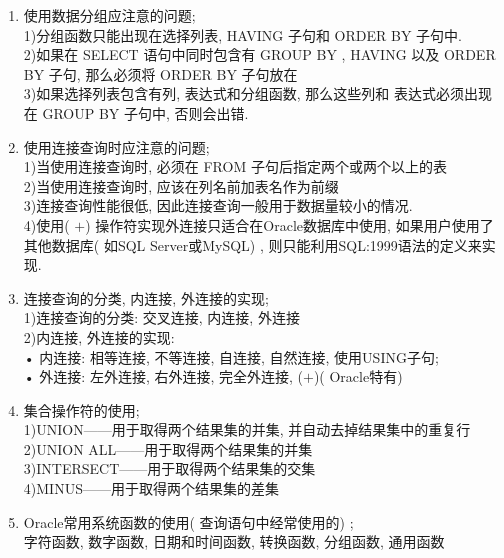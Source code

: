 \documentclass{article}                     %
\numberwithin{equation}{section}            %
\numberwithin{figure}{section}              %
\numberwithin{table}{section}               %
\begin{document}
\begin{enumerate}
\item 使用数据分组应注意的问题; \\
1)分组函数只能出现在选择列表, HAVING 子句和 ORDER BY 子句中. \\
2)如果在 SELECT 语句中同时包含有 GROUP BY , HAVING 以及 ORDER BY 子句, 那么必须将 ORDER BY 子句放在\\
3)如果选择列表包含有列, 表达式和分组函数, 那么这些列和 表达式必须出现在 GROUP BY 子句中, 否则会出错. \\



\item 使用连接查询时应注意的问题; \\
1)当使用连接查询时, 必须在 FROM 子句后指定两个或两个以上的表\\
2)当使用连接查询时, 应该在列名前加表名作为前缀\\
3)连接查询性能很低, 因此连接查询一般用于数据量较小的情况. \\
4)使用( $+$) 操作符实现外连接只适合在Oracle数据库中使用, 如果用户使用了其他数据库( 如SQL Server或MySQL) , 则只能利用SQL:1999语法的定义来实现. \\



\item 连接查询的分类, 内连接, 外连接的实现; \\
1)连接查询的分类: 交叉连接, 内连接, 外连接\\
2)内连接, 外连接的实现: \\
• 内连接: 相等连接, 不等连接, 自连接, 自然连接, 使用USING子句; \\
• 外连接: 左外连接, 右外连接, 完全外连接, ($+$)( Oracle特有) \\



\item 集合操作符的使用; \\
1)UNION——用于取得两个结果集的并集, 并自动去掉结果集中的重复行\\
2)UNION ALL——用于取得两个结果集的并集\\
3)INTERSECT——用于取得两个结果集的交集\\
4)MINUS——用于取得两个结果集的差集\\



\item Oracle常用系统函数的使用( 查询语句中经常使用的) ; \\
字符函数, 数字函数, 日期和时间函数, 转换函数, 分组函数, 通用函数\\




\end{enumerate}
\end{document}

